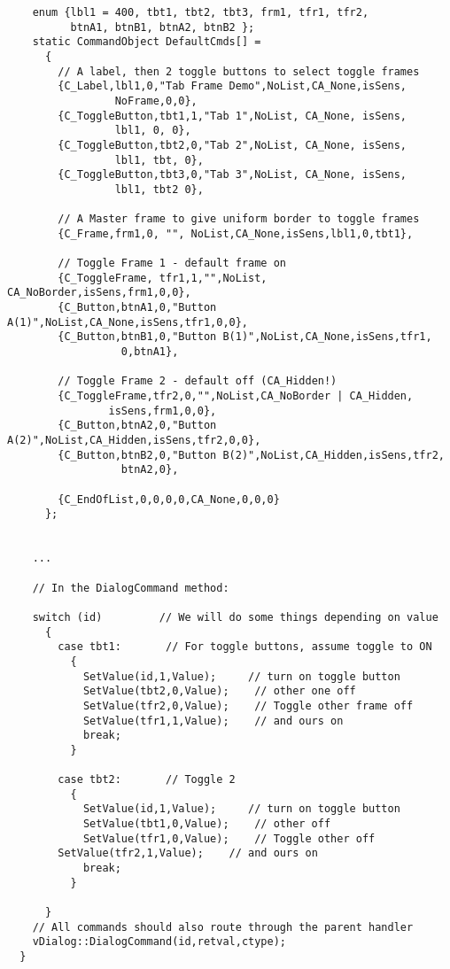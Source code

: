 \begin{verbatim}
    enum {lbl1 = 400, tbt1, tbt2, tbt3, frm1, tfr1, tfr2,
          btnA1, btnB1, btnA2, btnB2 };
    static CommandObject DefaultCmds[] =
      {
        // A label, then 2 toggle buttons to select toggle frames
        {C_Label,lbl1,0,"Tab Frame Demo",NoList,CA_None,isSens,
                 NoFrame,0,0},
        {C_ToggleButton,tbt1,1,"Tab 1",NoList, CA_None, isSens, 
                 lbl1, 0, 0},
        {C_ToggleButton,tbt2,0,"Tab 2",NoList, CA_None, isSens, 
                 lbl1, tbt, 0},
        {C_ToggleButton,tbt3,0,"Tab 3",NoList, CA_None, isSens,
                 lbl1, tbt2 0},

        // A Master frame to give uniform border to toggle frames
        {C_Frame,frm1,0, "", NoList,CA_None,isSens,lbl1,0,tbt1},

        // Toggle Frame 1 - default frame on
        {C_ToggleFrame, tfr1,1,"",NoList, CA_NoBorder,isSens,frm1,0,0},
        {C_Button,btnA1,0,"Button A(1)",NoList,CA_None,isSens,tfr1,0,0},
        {C_Button,btnB1,0,"Button B(1)",NoList,CA_None,isSens,tfr1,
                  0,btnA1},

        // Toggle Frame 2 - default off (CA_Hidden!)
        {C_ToggleFrame,tfr2,0,"",NoList,CA_NoBorder | CA_Hidden,
                isSens,frm1,0,0},
        {C_Button,btnA2,0,"Button A(2)",NoList,CA_Hidden,isSens,tfr2,0,0},
        {C_Button,btnB2,0,"Button B(2)",NoList,CA_Hidden,isSens,tfr2,
                  btnA2,0},

        {C_EndOfList,0,0,0,0,CA_None,0,0,0}
      };


    ...

    // In the DialogCommand method:

    switch (id)         // We will do some things depending on value
      {
        case tbt1:       // For toggle buttons, assume toggle to ON
          {
            SetValue(id,1,Value);     // turn on toggle button
            SetValue(tbt2,0,Value);    // other one off
            SetValue(tfr2,0,Value);    // Toggle other frame off
            SetValue(tfr1,1,Value);    // and ours on
            break;
          }

        case tbt2:       // Toggle 2
          {
            SetValue(id,1,Value);     // turn on toggle button
            SetValue(tbt1,0,Value);    // other off
            SetValue(tfr1,0,Value);    // Toggle other off
	    SetValue(tfr2,1,Value);    // and ours on
            break;
          }

      }
    // All commands should also route through the parent handler
    vDialog::DialogCommand(id,retval,ctype);
  }
\end{verbatim}

